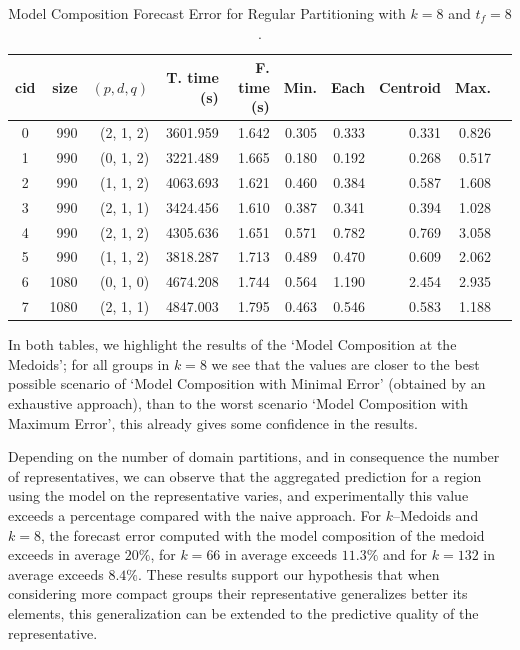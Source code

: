 \begin{table}[h]
	\centering
	\small
	\begin{tabular}{|c|r|r|r|r|r|r|r|r|r|}
		\hline
        cid & size & $(p, d, q)$ & T. time (s) & F. time (s) & Min. & Each & \cellcolor{red!20}Centroid & Max. \\
        \hline
        0 &  990 & (2, 1, 2) &  3601.959 & 1.642 & 0.305 & 0.333 & \cellcolor{red!20}0.331 & 0.826 \\
        1 &  990 & (0, 1, 2) &  3221.489 & 1.665 & 0.180 & 0.192 & \cellcolor{red!20}0.268 & 0.517 \\
        2 &  990 & (1, 1, 2) &  4063.693 & 1.621 & 0.460 & 0.384 & \cellcolor{red!20}0.587 & 1.608 \\
        3 &  990 & (2, 1, 1) &  3424.456 & 1.610 & 0.387 & 0.341 & \cellcolor{red!20}0.394 & 1.028 \\
        4 &  990 & (2, 1, 2) &  4305.636 & 1.651 & 0.571 & 0.782 & \cellcolor{red!20}0.769 & 3.058 \\
        5 &  990 & (1, 1, 2) &  3818.287 & 1.713 & 0.489 & 0.470 & \cellcolor{red!20}0.609 & 2.062 \\
        6 & 1080 & (0, 1, 0) &  4674.208 & 1.744 & 0.564 & 1.190 & \cellcolor{red!20}2.454 & 2.935 \\
        7 & 1080 & (2, 1, 1) &  4847.003 & 1.795 & 0.463 & 0.546 & \cellcolor{red!20}0.583 & 1.188 \\ \hline
	\end{tabular}
	\caption{Model Composition Forecast Error for Regular Partitioning with $k=8$ and $t_{f} =8$.}
	\label{Table:ForecastErrorRegulark10}
\end{table}

In both tables, we highlight the results of the `Model Composition at the Medoids'; for all groups in $k=8$ we see that the values are closer to the best possible scenario of `Model Composition with Minimal Error' (obtained by an exhaustive approach), than to the worst scenario `Model Composition with Maximum Error', this already gives some confidence in the results. 

Depending on the number of domain partitions, and in consequence the number of representatives, we can observe that the aggregated prediction for a region using the model on the representative varies, and experimentally this value exceeds a percentage compared with the naive approach. For $k$--Medoids and $k=8$, the forecast error computed with the model composition of the medoid exceeds in average $20\%$, for $k=66$ in average exceeds $11.3\%$ and for $k=132$ in average exceeds $8.4\%$. These results support our hypothesis that when considering more compact groups their representative generalizes better its elements, this generalization can be extended to the predictive quality of the representative.

